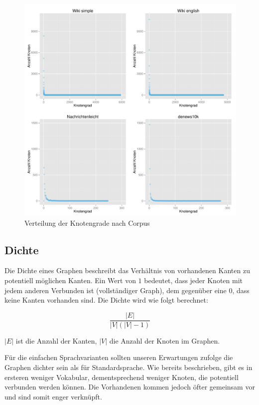 \documentclass[11pt, a4paper]{article}
\begin{document}
\begin{figure}[ht]
    \centering
        \includegraphics[scale=.5]{vdeg_plots.pdf}
    \caption{Verteilung der Knotengrade nach Corpus}
    \label{fig-vdeg}
\end{figure}


\subsection{Dichte}

Die Dichte eines Graphen beschreibt das Verhältnis von vorhandenen Kanten zu
potentiell möglichen Kanten.
Ein Wert von $1$ bedeutet, dass jeder Knoten mit jedem anderen Verbunden ist
(vollständiger Graph), dem gegenüber eine $0$, dass keine Kanten vorhanden sind.
Die Dichte wird wie folgt berechnet:

$$
    \frac{|E|}{|V|\left(|V|-1\right)}
$$

$|E|$ ist die Anzahl der Kanten, $|V|$ die Anzahl der Knoten im Graphen. 

Für die einfachen Sprachvarianten sollten unseren Erwartungen zufolge die
Graphen dichter sein als für Standardsprache.
Wie bereits beschrieben, gibt es in ersteren weniger Vokabular, dementsprechend
weniger Knoten, die potentiell verbunden werden können. Die Vorhandenen kommen
jedoch öfter gemeinsam vor und sind somit enger verknüpft.
\end{document}
